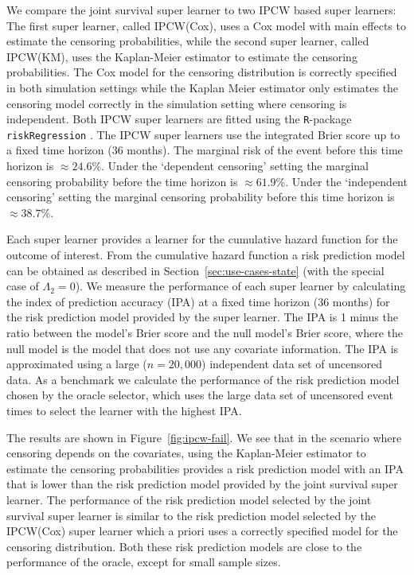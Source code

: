 \documentclass[a4paper,danish]{article}
\theoremstyle{plain} %
\numberwithin{theorem}{section}
\theoremstyle{definition} %
\theoremstyle{remark}
\newcommand{\1}{\mathds{1}}
\begin{document}
We compare the joint survival super learner to two IPCW based super learners: The
first super learner, called IPCW(Cox), uses a Cox model with main
effects to estimate the censoring probabilities, while the second
super learner, called IPCW(KM), uses the Kaplan-Meier estimator to
estimate the censoring probabilities. The Cox model for the censoring
distribution is correctly specified in both simulation settings while
the Kaplan Meier estimator only estimates the censoring model
correctly in the simulation setting where censoring is
independent. Both IPCW super learners are fitted using the
\texttt{R}-package \texttt{riskRegression}
\citep{Gerds_Ohlendorff_Ozenne_2023}.
%
%
The IPCW super learners use the integrated Brier score up to a fixed time
horizon (36 months). The marginal risk of the event before this time horizon is
\(\approx 24.6\)\%. Under the `dependent censoring' setting the marginal
censoring probability before the time horizon is \(\approx 61.9\)\%. Under the
`independent censoring' setting the marginal censoring probability before this
time horizon is \( \approx 38.7 \)\%.

Each super learner provides a learner for the cumulative
hazard function for the outcome of interest. From the
cumulative hazard function a risk prediction model can be
obtained as described in Section~\ref{sec:use-cases-state}
(with the special case of $\Lambda_2 = 0$). We measure the
performance of each super learner by calculating the index of
prediction accuracy (IPA) \citep{kattan2018index} at a fixed
time horizon (36 months) for the risk prediction model
provided by the super learner. The IPA is 1 minus the ratio
between the model's Brier score and the null model's Brier
score, where the null model is the model that does not use any
covariate information. The IPA is approximated using a large
(\( n = 20,000 \)) independent data set of uncensored data. As
a benchmark we calculate the performance of the risk
prediction model chosen by the oracle selector, which uses the
large data set of uncensored event times to select the learner
with the highest IPA.

The results are shown in Figure~\ref{fig:ipcw-fail}. We see that in
the scenario where censoring depends on the covariates, using the
Kaplan-Meier estimator to estimate the censoring probabilities
provides a risk prediction model with an IPA that is lower than the
risk prediction model provided by the joint survival super learner. The performance
of the risk prediction model selected by the joint survival super learner is similar
to the risk prediction model selected by the IPCW(Cox) super learner
which a priori uses a correctly specified model for the censoring
distribution. Both these risk prediction models are close to the
performance of the oracle, except for small sample sizes.
\end{document}
